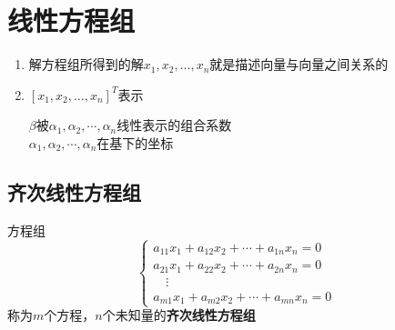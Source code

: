 \documentclass[./linear_algebra.tex]{subfiles}
\begin{document}
    \section{线性方程组}

    \begin{enumerate}
        \item 解方程组所得到的解$x_1, x_2, \dots, x_n$就是描述向量与向量之间关系的{\color{red}{表示系数}}
        \item $[x_1, x_2, \dots, x_n]^T$表示\begin{cases*}
                                                $\beta$被$\alpha_1, \alpha_2, \cdots, \alpha_n$线性表示的组合系数 \\
                                                $\alpha_1, \alpha_2, \cdots, \alpha_n$在基下的坐标 \\

        \end{cases*}
    \end{enumerate}

    \subsection{齐次线性方程组}

    方程组
    \[
        \begin{cases}
            a_{11}x_1 + a_{12}x_2 + \cdots + a_{1n}x_n = 0 \\
            a_{21}x_1 + a_{22}x_2 + \cdots + a_{2n}x_n = 0 \\
            \quad \vdots \\
            a_{m1}x_1 + a_{m2}x_2 + \cdots + a_{mn}x_n = 0
        \end{cases}
    \]
    称为$m$个方程，$n$个未知量的\textbf{齐次线性方程组}
\end{document}
